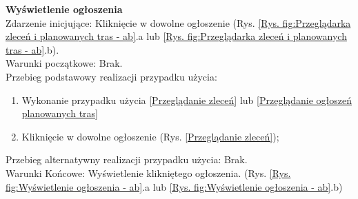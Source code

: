 \textbf{Wyświetlenie ogłoszenia} \\
Zdarzenie inicjujące: Kliknięcie w dowolne ogłoszenie (Rys. \ref{Rys. fig:Przeglądarka zleceń i planowanych tras - ab}.a lub \ref{Rys. fig:Przeglądarka zleceń i planowanych tras - ab}.b). \\
Warunki początkowe: Brak. \\
Przebieg podstawowy realizacji przypadku użycia:
\begin{enumerate}
    \item Wykonanie przypadku użycia \ref{Przeglądanie zleceń} lub \ref{Przeglądanie ogłoszeń planowanych tras}
    \item Kliknięcie w dowolne ogłoszenie (Rys. \ref{Przeglądanie zleceń});
\end{enumerate}
Przebieg alternatywny realizacji przypadku użycia: Brak. \\
Warunki Końcowe: Wyświetlenie klikniętego ogłoszenia. (Rys. \ref{Rys. fig:Wyświetlenie ogłoszenia - ab}.a lub \ref{Rys. fig:Wyświetlenie ogłoszenia - ab}.b)
